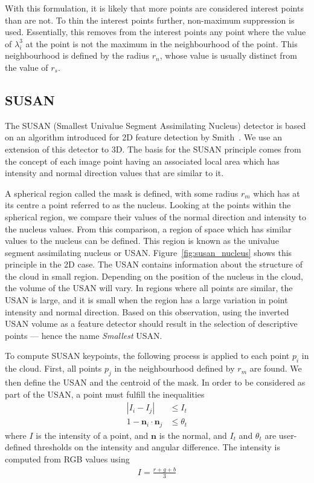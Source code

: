 \documentclass[11pt,a4paper]{kth-mag}
\begin{document}
With this formulation, it is likely that more points are considered interest
points than are not. To thin the interest points further, non-maximum
suppression is used. Essentially, this removes from the interest points any
point where the value of $\lambda^3_i$ at the point is not the maximum in the
neighbourhood of the point. This neighbourhood is defined by the radius $r_{n}$,
whose value is usually distinct from the value of $r_s$.
\subsection{SUSAN}
The SUSAN (Smallest Univalue Segment Assimilating Nucleus) detector is based on
an algorithm introduced for 2D feature detection by Smith~\cite{smith1997susan}.
We use an extension of this detector to 3D. The basis for the SUSAN principle
comes from the concept of each image point having an associated local area which
has intensity and normal direction values that are similar to it.

A spherical region called the mask is defined, with some radius $r_m$ which has
at its centre a point referred to as the nucleus. Looking at the points within
the spherical region, we compare their values of the normal direction and
intensity to the nucleus values. From this comparison, a region of space which
has similar values to the nucleus can be defined. This region is known as the
univalue segment assimilating nucleus or USAN. Figure~\ref{fig:susan_nucleus}
shows this principle in the 2D case. The USAN contains information about the
structure of the cloud in small region. Depending on the position of the nucleus
in the cloud, the volume of the USAN will vary. In regions where all points are
similar, the USAN is large, and it is small when the region has a large
variation in point intensity and normal direction. Based on this observation,
using the inverted USAN volume as a feature detector should result in the
selection of descriptive points --- hence the name \emph{Smallest} USAN.

To compute SUSAN keypoints, the following process is applied to each point $p_i$
in the cloud. First, all points $p_j$ in the neighbourhood defined by $r_m$ are
found. We then define the USAN and the centroid of the mask. In order to be
considered as part of the USAN, a point must fulfill the inequalities
\begin{align}
  \label{eq:9}
  \left|I_i-I_j\right|&\leq I_t\\
  1-\mathbf{n}_i\cdot\mathbf{n}_j&\leq \theta_t
\end{align}
where $I$ is the intensity of a point, and $\mathbf{n}$ is the normal, and $I_t$
and $\theta_t$ are user-defined thresholds on the intensity and angular
difference. The intensity is computed from RGB values using
\begin{align}
  \label{eq:10}
  I=\frac{r+g+b}{3}
\end{align}
\end{document}
